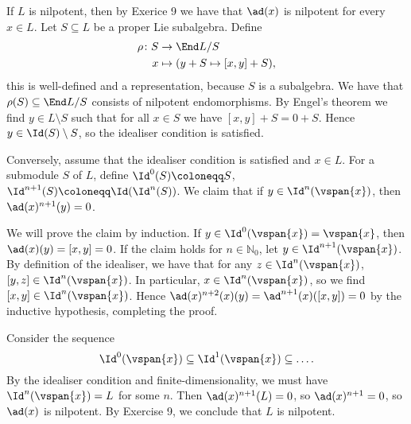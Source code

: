 If $L$ is nilpotent, then by Exerice 9 we have that $\ad(x)$ is nilpotent for
every $x \in L$. Let $S \subseteq L$ be a proper Lie subalgebra. Define
\begin{align*}
	\rho\colon S&\to \End L/S\\
	x&\mapsto (y + S\mapsto [x, y] + S),
\end{align*}
this is well-defined and a representation, because $S$ is a subalgebra.
We have that $\rho(S) \subseteq \End L/S$ consists of nilpotent endomorphisms.
By Engel's theorem we find $y \in L\setminus S$ such that for all $x \in S$
we have $[x, y] + S = 0 + S$. Hence $y \in \Id(S)\setminus S$, so the idealiser
condition is satisfied.

Conversely, assume that the idealiser condition is satisfied and $x \in L$.
For a submodule $S$ of $L$, define $\Id^0(S)\coloneqq S$,
$\Id^{n+1}(S)\coloneqq \Id(\Id^n(S))$. We claim that if
$y \in \Id^n(\vspan{x})$, then $\ad(x)^{n+1}(y) = 0$.

We will prove the claim by induction. If $y \in \Id^0(\vspan{x}) = \vspan{x}$,
then $\ad(x)(y) = [x, y] = 0$. If the claim holds for $n \in \mathbb{N}_0$,
let $y \in \Id^{n+1}(\vspan{x})$. By definition of the idealiser, we have
that for any $z \in \Id^{n}(\vspan{x})$, $[y, z] \in \Id^n(\vspan{x})$.
In particular, $x \in \Id^{n}(\vspan{x})$, so we find $[x, y] \in \Id^n(\vspan{x})$.
Hence $\ad(x)^{n+2}(x)(y) = \ad^{n+1}(x)([x, y]) = 0$ by the inductive
hypothesis, completing the proof.

Consider the sequence
\[ \Id^0(\vspan{x}) \subseteq \Id^1(\vspan{x}) \subseteq \ldots. \]
By the idealiser condition and finite-dimensionality, we must have $\Id^n(\vspan{x}) = L$ for some
$n$. Then $\ad(x)^{n+1}(L) = 0$, so $\ad(x)^{n+1} = 0$, so $\ad(x)$ is nilpotent.
By Exercise 9, we conclude that $L$ is nilpotent.
